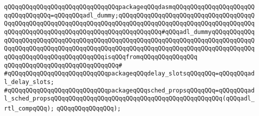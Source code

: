 \verb|qQQqqQQqqQQqqQQqqQQqqQQqqQQqqQQqpackageqQQqdasmqQQqqQQqqQQqqQQqqQQqqQQqqQQqqQQqqQQq=qQQqqQQqadl_dummy;qQQqqQQqqQQqqQQqqQQqqQQqqQQqqQQqqQQqqQQqqQQqqQQqqQQqqQQqqQQqqQQqqQQqqQQqqQQqqQQqqQQqqQQqqQQqqQQqqQQqqQQqqQQqqQQqqQQqqQQqqQQqqQQqqQQqqQQqqQQqqQQqqQQqqQQq#qQQqadl_dummyqQQqqQQqqQQqqQQqqQQqqQQqqQQqqQQqqQQqqQQqqQQqqQQqqQQqqQQqqQQqqQQqqQQqqQQqqQQqqQQqqQQqqQQqqQQqqQQqqQQqqQQqqQQqqQQqqQQqqQQqqQQqqQQqqQQqqQQqqQQqqQQqqQQqqQQqqQQqqQQqqQQqqQQqqQQqqQQqqQQqisqQQqfromqQQqqQQqqQQq|\verb|qQQq|\newline
\verb|qQQqqQQqqQQqqQQqqQQqqQQqqQQqqQQq#|\newline
\verb|#qQQqqQQqqQQqqQQqqQQqqQQqqQQqpackageqQQqdelay_slotsqQQqqQQq=qQQqqQQqadl_delay_slots;|\newline
\verb|#qQQqqQQqqQQqqQQqqQQqqQQqqQQqpackageqQQqsched_propsqQQqqQQq=qQQqqQQqadl_sched_propsqQQqqQQqqQQqqQQqqQQqqQQqqQQqqQQqqQQqqQQqqQQqqQQq(qQQqadl_rtl_compqQQq);|\newline
\verb|qQQqqQQqqQQqqQQq);|\newline

